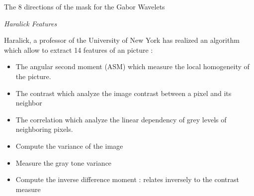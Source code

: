 
    The 8 directions of the mask for the Gabor Wavelets
    
\textit{Haralick Features}

Haralick, a professor of the University of New York has realized an algorithm which allow to extract 14 features of an picture : 

\begin{itemize}
\item The angular second moment (ASM) which measure the local homogeneity of the picture.
\end{itemize}
\begin{itemize}
\item The contrast which analyze the image contrast between a pixel and its neighbor
\end{itemize}
\begin{itemize}
\item The correlation which analyze the linear dependency of grey levels of neighboring pixels.
\end{itemize}
\begin{itemize}
\item Compute the variance of the image
\end{itemize}
\begin{itemize}
\item Measure the gray tone variance
\end{itemize}
\begin{itemize}
\item Compute the inverse difference moment : relates inversely to the contrast measure
\end{itemize}